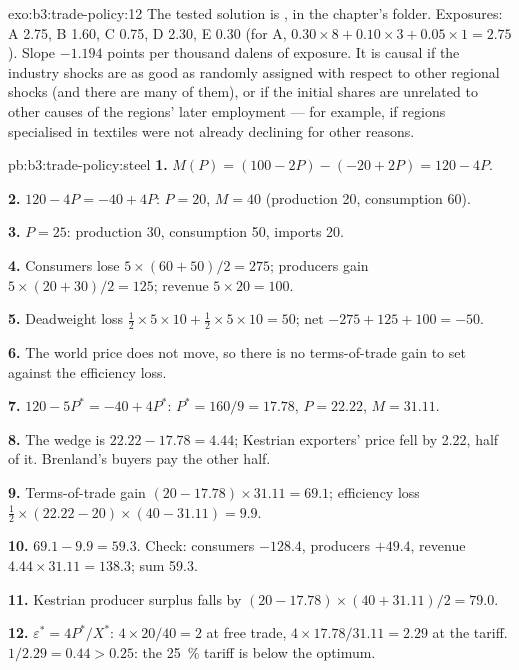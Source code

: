 \begin{solution}{exo:b3:trade-policy:12}
The tested solution is , in the chapter's
 folder. Exposures: A 2.75, B 1.60, C 0.75, D 2.30, E 0.30 (for A,
$0.30 \times 8 + 0.10 \times 3 + 0.05 \times 1 = 2.75$). Slope $-1.194$ points per thousand
dalens of exposure. %
It is causal if the industry shocks are as good as randomly assigned with respect
to other regional shocks (and there are many of them), or if the initial shares
are unrelated to other causes of the regions' later employment --- for example,
if regions specialised in textiles were not already declining for other reasons.
\end{solution}

\begin{solution}{pb:b3:trade-policy:steel}
\textbf{1.} $M(P) = (100 - 2P) - (-20 + 2P) = 120 - 4P$. %

\textbf{2.} $120 - 4P = -40 + 4P$: $P = 20$, $M = 40$ (production 20, consumption 60).

\textbf{3.} $P = 25$: production 30, consumption 50, imports 20.

\textbf{4.} Consumers lose $5 \times (60 + 50)/2 = 275$; producers gain $5 \times (20 + 30)/2 = 125$;
revenue $5 \times 20 = 100$.

\textbf{5.} Deadweight loss $\tfrac12 \times 5 \times 10 + \tfrac12 \times 5 \times 10 = 50$; net $-275 + 125 + 100
= -50$.

\textbf{6.} The world price does not move, so there is no terms-of-trade gain to
set against the efficiency loss.

\textbf{7.} $120 - 5P^* = -40 + 4P^*$: $P^* = 160/9 = 17.78$, $P = 22.22$, $M = 31.11$.

\textbf{8.} The wedge is $22.22 - 17.78 = 4.44$; Kestrian exporters' price fell by 2.22,
half of it. Brenland's buyers pay the other half.

\textbf{9.} Terms-of-trade gain $(20 - 17.78) \times 31.11 = 69.1$; efficiency loss $\tfrac12 \times
(22.22 - 20) \times (40 - 31.11) = 9.9$.

\textbf{10.} $69.1 - 9.9 = 59.3$. Check: consumers $-128.4$, producers $+49.4$, revenue $4.44
\times 31.11 = 138.3$; sum 59.3.

\textbf{11.} Kestrian producer surplus falls by $(20 - 17.78) \times (40 + 31.11)/2 = 79.0$.

\textbf{12.} $\varepsilon^* = 4P^*/X^*$: $4 \times 20/40 = 2$ at free trade, $4 \times 17.78/31.11 = 2.29$ at the
tariff. $1/2.29 = 0.44 > 0.25$: the 25~\% tariff is below the optimum.


\end{solution}
